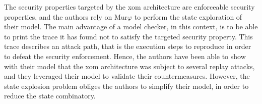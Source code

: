 The security properties targeted by the \ac{xom} architecture are enforceable
security properties, and the authors rely on Mur$\varphi$ to perform the state
exploration of their model.
%
The main advantage of a model checker, in this context, is to be able to print
the trace it has found not to satisfy the targeted security property.
%
This trace describes an attack path, that is the execution steps to reproduce in
order to defeat the security enforcement.
%
Hence, the authors have been able to show with their model that the \ac{xom}
architecture was subject to several replay attacks, and they leveraged their
model to validate their countermeasures.
%
However, the state explosion problem obliges the authors to simplify their
model, in order to reduce the state combinatory.

%

